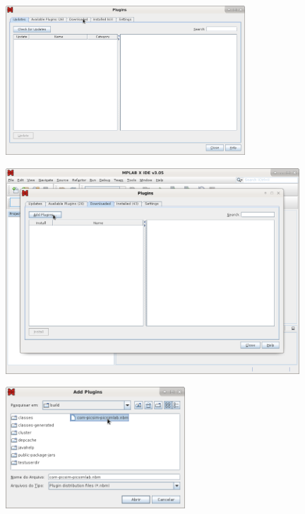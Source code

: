 \begin{figure}[H]
\center
\includegraphics[width=0.8\textwidth]{img/hmd/mplab02.png} 
\end{figure} 

\begin{figure}[H]
\center
\includegraphics[width=0.98\textwidth]{img/hmd/mplab03.png} 
\end{figure} 

\begin{figure}[H]
\center
\includegraphics[width=0.6\textwidth]{img/hmd/mplab04.png} 
\end{figure} 

